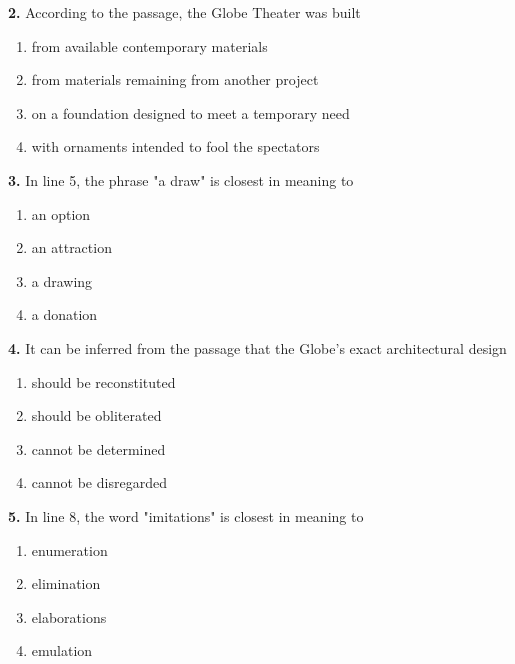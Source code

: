 \documentclass[12pt]{article}
\begin{document}
\par
\vspace{0.25\baselineskip}
\noindent\textbf{2.} According to the passage, the Globe Theater was built
\begin{enumerate}[label=(\Alph*),leftmargin=*,itemsep=0.2em]
\item from available contemporary materials
\item from materials remaining from another project
\item on a foundation designed to meet a temporary need
\item with ornaments intended to fool the spectators
\end{enumerate}
\par
\vspace{0.25\baselineskip}
\noindent\textbf{3.} In line 5, the phrase "a draw" is closest in meaning to
\begin{enumerate}[label=(\Alph*),leftmargin=*,itemsep=0.2em]
\item an option
\item an attraction
\item a drawing
\item a donation
\end{enumerate}
\par
\vspace{0.25\baselineskip}
\noindent\textbf{4.} It can be inferred from the passage that the Globe's exact architectural design
\begin{enumerate}[label=(\Alph*),leftmargin=*,itemsep=0.2em]
\item should be reconstituted
\item should be obliterated
\item cannot be determined
\item cannot be disregarded
\end{enumerate}
\par
\vspace{0.25\baselineskip}
\noindent\textbf{5.} In line 8, the word "imitations" is closest in meaning to
\begin{enumerate}[label=(\Alph*),leftmargin=*,itemsep=0.2em]
\item enumeration
\item elimination
\item elaborations
\item emulation
\end{enumerate}
\par
\vspace{0.25\baselineskip}
\end{document}
